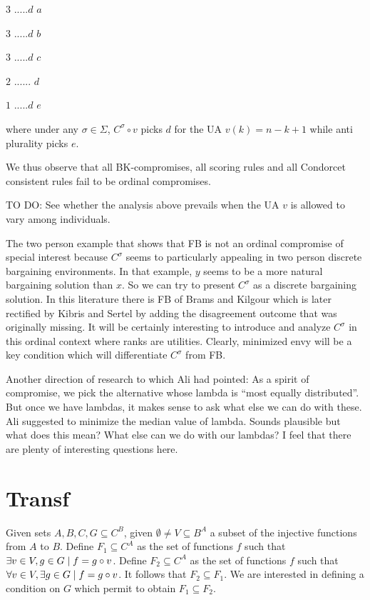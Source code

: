 \documentclass[version=3.21, pagesize, notitlepage, twoside=off, bibliography=totoc, DIV=calc, fontsize=12pt, a4paper]{scrartcl}
\begin{document}
$3$ $.....d$ $a$

$3$ $.....d$ $b$

$3$ $.....d$ $c$

$2$ $......$ $d$

$1$ $.....d$ $e$

\bigskip

where under any $\sigma \in \Sigma $, $C^{\sigma }\circ v$ picks $d$ for the UA $v(k)=n-k+1$ while anti plurality picks $e$.

We thus observe that all BK-compromises, all scoring rules and all Condorcet consistent rules fail to be ordinal compromises.

TO DO: See whether the analysis above prevails when the UA $v$ is allowed to vary among individuals.

The two person example that shows that FB is not an ordinal compromise of special interest because $C^{\sigma }$ seems to particularly appealing in two person discrete bargaining environments. In that example, $y$ seems to be a more natural bargaining solution than $x$. So we can try to present $C^{\sigma }$ as a discrete bargaining solution. In this literature there is FB of Brams and Kilgour which is later rectified by Kibris and Sertel \cite{Sertel1999} by adding the disagreement outcome that was originally missing. It will be certainly interesting to introduce and analyze $C^{\sigma }$ in this ordinal context where ranks are utilities. Clearly, minimized envy will be a key condition which will differentiate $C^{\sigma }$ from FB.

Another direction of research to which Ali had pointed: As a spirit of compromise, we pick the alternative whose lambda is “most equally distributed”. But once we have lambdas, it makes sense to ask what else we can do with these. Ali suggested to minimize the median value of lambda. Sounds plausible but what does this mean? What else can we do with our lambdas? I feel that there are plenty of interesting questions here.




\appendix
\section{Transf}
Given sets $A, B, C, G \subseteq C^B$, given $\emptyset ≠ V \subseteq B^A$ a subset of the injective functions from $A$ to $B$. Define $F_1 \subseteq C^A$ as the set of functions $f$ such that $\exists v \in V, g \in G \suchthat f = g \circ v$. Define $F_2 \subseteq C^A$ as the set of functions $f$ such that $\forall v \in V, \exists g \in G \suchthat f = g \circ v$. It follows that $F_2 \subseteq F_1$. We are interested in defining a condition on $G$ which permit to obtain $F_1 \subseteq F_2$. 
\end{document}
